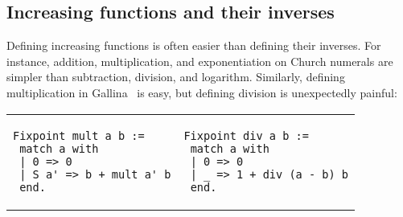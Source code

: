 
\subsection{Increasing functions and their inverses}
\label{sec:incfuncinv}
Defining increasing functions is often easier than defining their inverses.
For instance, addition, multiplication, and exponentiation on Church numerals
are simpler than subtraction, division, and logarithm. Similarly, defining multiplication in Gallina~\cite{coq} is easy, but defining division is unexpectedly painful:

\begin{minipage}[c]{0.4\textwidth}
\begin{tabular}{@{}l@{}@{\qquad \qquad}l}
\begin{lstlisting}
Fixpoint mult a b :=
 match a with
 | 0 => 0
 | S a' => b + mult a' b
 end.
\end{lstlisting}
&
\begin{lstlisting}
Fixpoint div a b :=
 match a with
 | 0 => 0
 | _ => 1 + div (a - b) b
 end.
\end{lstlisting}
\end{tabular} \\[5pt]
\end{minipage}

